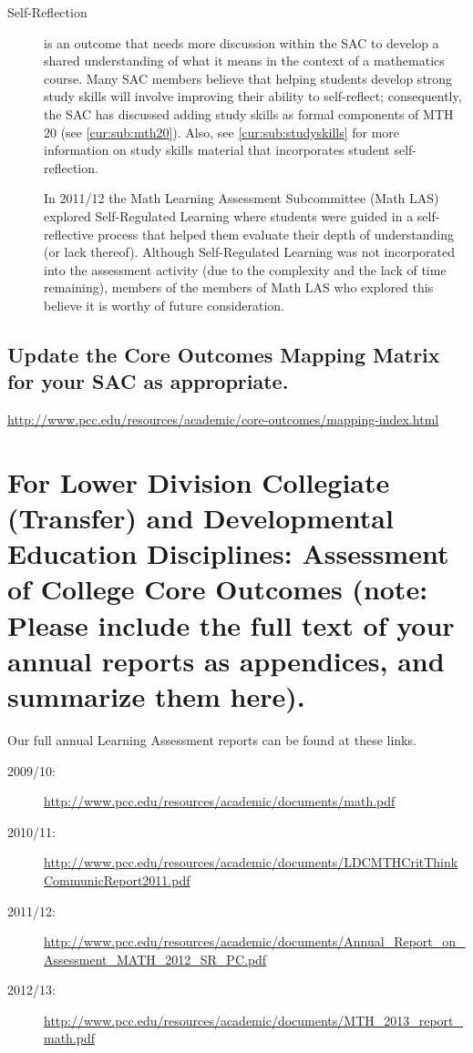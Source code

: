 \begin{description}
\item[Self-Reflection] is an outcome that needs more discussion within the SAC to develop a shared understanding of what it means in the context of a mathematics course.  Many SAC members believe that helping students develop strong study skills will involve improving their ability to self-reflect; consequently, the SAC has discussed adding study skills as formal components of MTH 20 (see \vref{cur:sub:mth20}).  Also,  see \vref{cur:sub:studyskills} for more information on study skills material that incorporates student self-reflection. 

In 2011/12 the Math Learning Assessment Subcommittee (Math LAS) explored Self-Regulated Learning where students were guided in a self-reflective process that helped them evaluate their depth of understanding (or lack thereof).  Although Self-Regulated Learning was not incorporated into the assessment activity (due to the complexity and the lack of time remaining), members of the members of Math LAS who explored this believe it is worthy of future consideration.

\end{description}

\subsection{Update the Core Outcomes Mapping Matrix for your SAC as appropriate.}\url{http://www.pcc.edu/resources/academic/core-outcomes/mapping-index.html} 




\section[Assessment of College Core Outcomes]{For Lower Division Collegiate (Transfer) and Developmental Education Disciplines:  Assessment of College Core Outcomes    (note:  Please include the full text of your annual reports as appendices, and summarize them here).  }\label{ass:sec:coreoutcomes}

Our full annual Learning Assessment reports can be found at these links. 

\begin{description}
\item[2009/10:] \url{http://www.pcc.edu/resources/academic/documents/math.pdf}
\item[2010/11:] \url{http://www.pcc.edu/resources/academic/documents/LDCMTHCritThinkCommunicReport2011.pdf}
\item[2011/12:] \url{http://www.pcc.edu/resources/academic/documents/Annual_Report_on_Assessment_MATH_2012_SR_PC.pdf}
\item[2012/13:] \url{http://www.pcc.edu/resources/academic/documents/MTH_2013_report_math.pdf}
\end{description}

